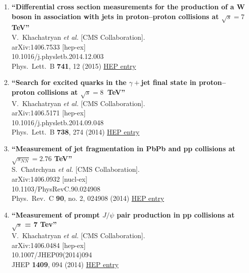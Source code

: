 \documentclass{article}
\begin{document}
\begin{enumerate}
\item%
{\bf ``Differential cross section measurements for the production of a W boson in association with jets in proton–proton collisions at $\sqrt s=7$ TeV''}
  \\{}V.~Khachatryan {\it et al.} [CMS Collaboration].
  \\{}arXiv:1406.7533 [hep-ex]
    \\{}10.1016/j.physletb.2014.12.003
\\{}Phys.\ Lett.\ B {\bf 741}, 12 (2015) %
\href{http://inspirehep.net/record/1303894}{HEP entry}


\item%
{\bf ``Search for excited quarks in the $\gamma +$jet final state in proton–proton collisions at $\sqrt s=8$ TeV''}
  \\{}V.~Khachatryan {\it et al.} [CMS Collaboration].
  \\{}arXiv:1406.5171 [hep-ex]
    \\{}10.1016/j.physletb.2014.09.048
\\{}Phys.\ Lett.\ B {\bf 738}, 274 (2014) %
\href{http://inspirehep.net/record/1301560}{HEP entry}


\item%
{\bf ``Measurement of jet fragmentation in PbPb and pp collisions at $\sqrt{s_{NN}}=2.76$ TeV''}
  \\{}S.~Chatrchyan {\it et al.} [CMS Collaboration].
  \\{}arXiv:1406.0932 [nucl-ex]
    \\{}10.1103/PhysRevC.90.024908
\\{}Phys.\ Rev.\ C {\bf 90}, no. 2, 024908 (2014) %
\href{http://inspirehep.net/record/1299142}{HEP entry}


\item%
{\bf ``Measurement of prompt $J/\psi$ pair production in pp collisions at $ \sqrt{s} $ = 7 Tev''}
  \\{}V.~Khachatryan {\it et al.} [CMS Collaboration].
  \\{}arXiv:1406.0484 [hep-ex]
    \\{}10.1007/JHEP09(2014)094
\\{}JHEP {\bf 1409}, 094 (2014) %
\href{http://inspirehep.net/record/1298812}{HEP entry}



\end{enumerate}
\end{document}
